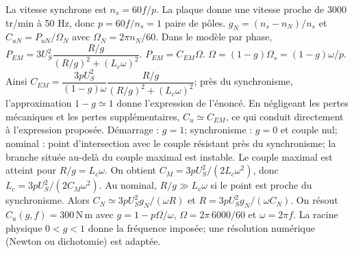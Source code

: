 \begin{corrigebox}
La vitesse synchrone est $n_s=60f/p$. La plaque donne une vitesse proche
            de $3000$ tr/min à 50 Hz, donc $p=60f/n_s=1$ paire de pôles.
$g_N=(n_s-n_N)/n_s$ et $C_{uN}=P_{uN}/\Omega_N$ avec
            $\Omega_N=2\pi n_N/60$.
Dans le modèle par phase,
            $P_{EM}=3U_S^2\dfrac{R/g}{(R/g)^2+(L_c\omega)^2}$.
$P_{EM}=C_{EM}\Omega$.
$\Omega=(1-g)\Omega_s=(1-g)\omega/p$. Ainsi
            $C_{EM}=\dfrac{3pU_S^2}{(1-g)\omega}\dfrac{R/g}{(R/g)^2+(L_c\omega)^2}$;
            près du synchronisme, l'approximation $1-g\simeq1$ donne l'expression de
            l'énoncé.
En négligeant les pertes mécaniques et les pertes supplémentaires,
            $C_u\simeq C_{EM}$, ce qui conduit directement à l'expression proposée.
Démarrage : $g=1$; synchronisme : $g=0$ et couple nul; nominal : point
            d'intersection avec le couple résistant près du synchronisme; la branche située
            au-delà du couple maximal est instable.
Le couple maximal est atteint pour $R/g=L_c\omega$. On obtient
            $C_M=3pU_S^2/(2L_c\omega^2)$, donc
            $\boxed{L_c=3pU_S^2/(2C_M\omega^2)}$.
Au nominal, $R/g\gg L_c\omega$ si le point est proche du synchronisme.
            Alors $C_N\simeq3pU_S^2g_N/(\omega R)$ et
            $\boxed{R=3pU_S^2g_N/(\omega C_N)}$.
On résout $C_u(g,f)=300\,\mathrm{N\,m}$ avec
            $g=1-p\Omega/\omega$, $\Omega=2\pi\,6000/60$ et $\omega=2\pi f$.
            La racine physique $0<g<1$ donne la fréquence imposée; une résolution
            numérique (Newton ou dichotomie) est adaptée.
\end{corrigebox}
